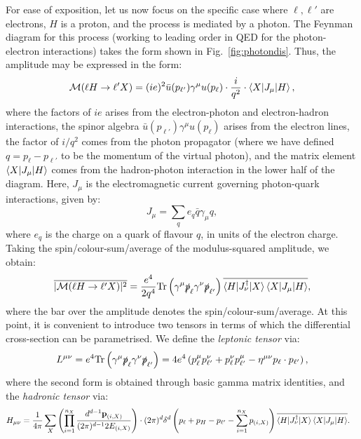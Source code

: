 \documentclass[withindex,glossary]{cam-thesis}
\renewcommand{\vec}[1]{\textbf{#1}} %
\begin{document}
For ease of exposition, let us now focus on the specific case where $\ell, \ell'$ are electrons, $H$ is a proton, and the process is mediated by a photon. The Feynman diagram for this process (working to leading order in QED for the photon-electron interactions) takes the form shown in Fig.~\ref{fig:photondis}. Thus, the amplitude may be expressed in the form:
\begin{equation}
\mathcal{M}(\ell H \rightarrow \ell'X) = (ie)^2 \bar{u}(p_{\ell'}) \gamma^{\mu} u(p_{\ell}) \cdot \frac{i}{q^2} \cdot \braket{X | J_{\mu} | H},
\end{equation}
where the factors of $ie$ arises from the electron-photon and electron-hadron interactions, the spinor algebra $\bar{u}(p_{\ell'}) \gamma^{\mu} u(p_{\ell})$ arises from the electron lines, the factor of $i/q^2$ comes from the photon propagator (where we have defined $q = p_{\ell} - p_{\ell'}$ to be the momentum of the virtual photon), and the matrix element $\braket{X | J_{\mu} | H}$ comes from the hadron-photon interaction in the lower half of the diagram. Here, $J_{\mu}$ is the electromagnetic current governing photon-quark interactions, given by:
\begin{equation}
J_{\mu} = \sum_{q} e_q \bar{q} \gamma_{\mu} q,
\end{equation}
where $e_q$ is the charge on a quark of flavour $q$, in units of the electron charge. Taking the spin/colour-sum/average of the modulus-squared amplitude, we obtain:
\begin{equation}
\overline{|\mathcal{M}(\ell H \rightarrow \ell'X)|^2} = \frac{e^4}{2q^4} \textrm{Tr}\left( \gamma^{\mu} \slashed{p}_{\ell} \gamma^{\nu} \slashed{p}_{\ell'} \right) \overline{\braket{H | J_{\nu}^{\dagger} | X}\braket{X | J_{\mu} | H}},
\end{equation}
where the bar over the amplitude denotes the spin/colour-sum/average. At this point, it is convenient to introduce two tensors in terms of which the differential cross-section can be parametrised. We define the \textit{leptonic tensor} via:
\begin{equation}
\label{eq:leptonic_tensor}
L^{\mu\nu} = e^4 \textrm{Tr}\left(  \gamma^{\mu} \slashed{p}_{\ell} \gamma^{\nu} \slashed{p}_{\ell'} \right) = 4e^4 \left( p_{\ell}^{\mu} p_{\ell'}^{\nu} + p_{\ell}^{\nu} p_{\ell'}^{\mu} - \eta^{\mu\nu} p_{\ell} \cdot p_{\ell'} \right),
\end{equation}
where the second form is obtained through basic gamma matrix identities, and the \textit{hadronic tensor} via:
\begin{align}
\label{eq:hadronic_tensor}
H_{\mu\nu} &= \frac{1}{4\pi} \sum_{X} \left(\prod_{i=1}^{n_X} \frac{d^{d-1} \vec{p}_{(i,X)}}{(2\pi)^{d-1} 2E_{(i,X)}}\right) \cdot (2\pi)^d \delta^d\left(p_\ell + p_H - p_{\ell'} - \sum_{i=1}^{n_X} p_{(i,X)}\right)  \overline{\braket{H | J_{\nu}^{\dagger} | X}\braket{X | J_{\mu} | H}}.
\end{align}
\end{document}
